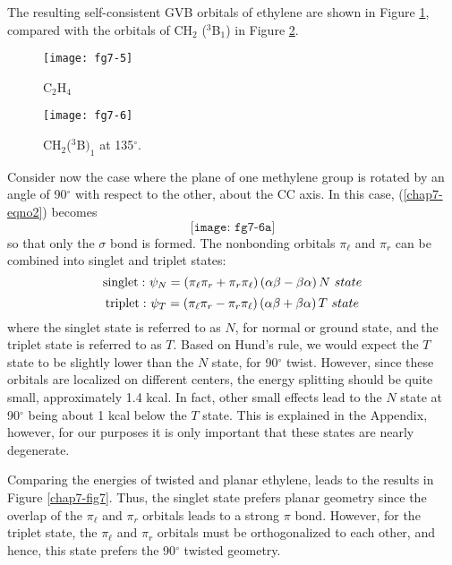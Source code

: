 The resulting self-consistent GVB orbitals \cite{chap7-ref1} of
ethylene are shown in Figure \ref{chap7-fig5}, compared with the
orbitals of CH$_2$ ($^3$B$_1$) in Figure \ref{chap7-fig6}.


\begin{figure}
\texttt{[image: fg7-5]}
\caption{C$_2$H$_4$}
\label{chap7-fig5}
\end{figure}


\begin{figure}
\texttt{[image: fg7-6]}
\caption{CH$_2$($^3$B$)_1$ at 135$^{\circ}$.}
\label{chap7-fig6}
\end{figure}

Consider now the case where the plane of one methylene group is
rotated by an angle of 90$^{\circ}$ with respect to the other, about
the CC axis.  In this case, (\ref{chap7-eqno2}) becomes
\begin{equation}
\texttt{[image: fg7-6a]}
\end{equation}
so that only the $\sigma$ bond is formed.  The nonbonding orbitals 
$\pi_{\ell}$ and $\pi_r$ can be combined into singlet and triplet states:
\begin{equation}
{\rm singlet:} ~ \psi_N = \left( \pi_{\ell} \pi_r + \pi_r \pi_{\ell} 
\right) \left( \alpha \beta - \beta \alpha \right) N ~ state
\label{chap07-eqno17}
\end{equation}
\begin{equation}
{\rm triplet:} ~ \psi_T = \left( \pi_{\ell} \pi_r - \pi_r \pi_{\ell} 
\right) \left( \alpha \beta + \beta \alpha \right) T ~ state
\label{chap07-eqno18}
\end{equation}
where the singlet state is referred to as $N$, for normal or ground 
state, and the triplet state is referred to as $T$.  Based on Hund's 
rule, we would expect the $T$ state to be slightly lower than the 
$N$ state, for 90$^{\circ}$ twist.  However, since these orbitals are 
localized on different centers, the energy splitting should 
be quite small, approximately 1.4 kcal.  In fact, other small effects 
lead to the $N$ state at 90$^{\circ}$ being 
about 1 kcal below the $T$ state.  This is explained in the Appendix, 
however, for our purposes it is only important that these states 
are nearly degenerate.

Comparing the energies of twisted and planar ethylene, leads to the
results in Figure \ref{chap7-fig7}. Thus, the singlet state prefers
planar geometry since the overlap of the $\pi_{\ell}$ and $\pi_r$
orbitals leads to a strong $\pi$ bond.  However, for the triplet
state, the $\pi_{\ell}$ and $\pi_r$ orbitals must be orthogonalized to
each other, and hence, this state prefers the 90$^{\circ}$ twisted
geometry.

